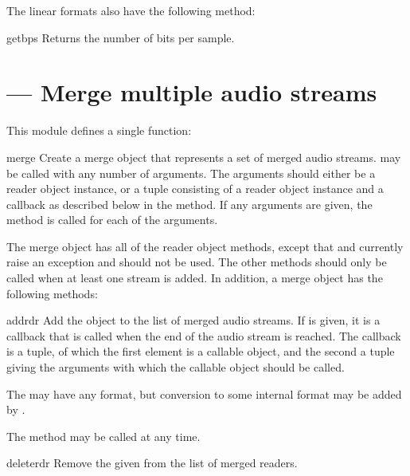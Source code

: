 The linear formats also have the following method:

\begin{methoddesc}{getbps}{}
Returns the number of bits per sample.
\end{methoddesc}


\section{
         --- Merge multiple audio streams}


This module defines a single function:

\begin{funcdesc}{merge}{}
Create a merge object that represents a set of merged audio streams.
 may be called with any number of arguments.  The
arguments should either be a reader object instance, or a tuple
consisting of a reader object instance and a callback as described
below in the  method.  If any arguments are given, the
 method is called for each of the arguments.
\end{funcdesc}

The merge object has all of the reader object methods, except that
 and  currently raise an exception and
should not be used.  The other methods should only be called when at
least one stream is added.  In addition, a merge object has the
following methods:

\begin{methoddesc}{add}{rdr}
Add the  object to the list of merged audio streams.  If
 is given, it is a callback that is called when the end
of the audio stream is reached.  The callback is a tuple, of which the
first element is a callable object, and the second a tuple giving the
arguments with which the callable object should be called.

The  may have any format, but conversion to some internal
format may be added by .

The  method may be called at any time.
\end{methoddesc}

\begin{methoddesc}{delete}{rdr}
Remove the given  from the list of merged readers.
\end{methoddesc}


